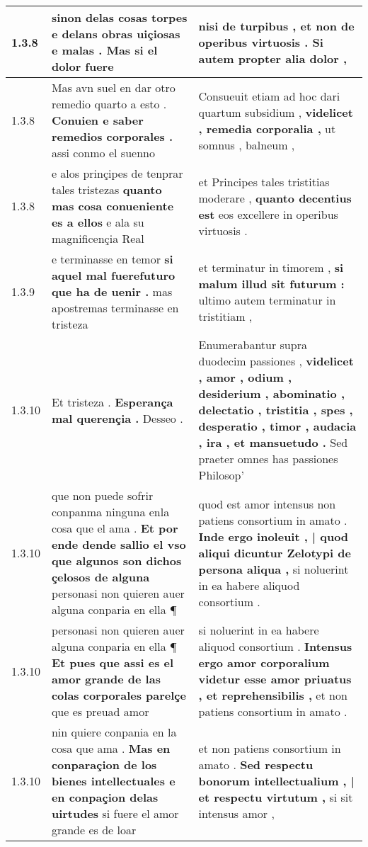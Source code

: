 \begin{tabular}{|p{1cm}|p{6.5cm}|p{6.5cm}|}
1.3.8 & sinon delas cosas torpes \textbf{ e delans obras uiçiosas e malas . } Mas si el dolor fuere & nisi de turpibus , \textbf{ et non de operibus virtuosis . } Si autem propter alia dolor , \\\hline
1.3.8 & Mas avn suel en dar otro remedio quarto a esto . \textbf{ Conuien e saber remedios corporales . } assi conmo el suenno & Consueuit etiam ad hoc dari quartum subsidium , \textbf{ videlicet , remedia corporalia , } ut somnus , balneum , \\\hline
1.3.8 & e alos prinçipes de tenprar tales tristezas \textbf{ quanto mas cosa conueniente es a ellos } e ala su magnificençia Real & et Principes tales tristitias moderare , \textbf{ quanto decentius est } eos excellere in operibus virtuosis . \\\hline
1.3.9 & e terminasse en temor \textbf{ si aquel mal fuerefuturo que ha de uenir . } mas apostremas terminasse en tristeza & et terminatur in timorem , \textbf{ si malum illud sit futurum : } ultimo autem terminatur in tristitiam , \\\hline
1.3.10 & Et tristeza . \textbf{ Esperança mal querençia . } Desseo . & Enumerabantur supra duodecim passiones , \textbf{ videlicet , amor , odium , desiderium , abominatio , delectatio , tristitia , spes , desperatio , timor , audacia , ira , et mansuetudo . } Sed praeter omnes has passiones Philosop’ \\\hline
1.3.10 & que non puede sofrir conpanma ninguna enla cosa que el ama . \textbf{ Et por ende dende sallio el vso que algunos son dichos çelosos de alguna } personasi non quieren auer alguna conparia en ella ¶ & quod est amor intensus non patiens consortium in amato . \textbf{ Inde ergo inoleuit , | quod aliqui dicuntur Zelotypi de persona aliqua , } si noluerint in ea habere aliquod consortium . \\\hline
1.3.10 & personasi non quieren auer alguna conparia en ella ¶ \textbf{ Et pues que assi es el amor grande de las colas corporales parelçe } que es preuad amor & si noluerint in ea habere aliquod consortium . \textbf{ Intensus ergo amor corporalium videtur esse amor priuatus , et reprehensibilis , } et non patiens consortium in amato . \\\hline
1.3.10 & nin quiere conpania en la cosa que ama . \textbf{ Mas en conparaçion de los bienes intellectuales e en conpaçion delas uirtudes } si fuere el amor grande es de loar & et non patiens consortium in amato . \textbf{ Sed respectu bonorum intellectualium , | et respectu virtutum , } si sit intensus amor , \\\hline

\end{tabular}
